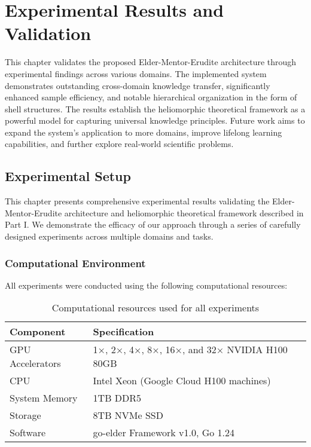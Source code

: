 \chapter{Experimental Results and Validation}

\begin{tcolorbox}[colback=blue!5!white,colframe=blue!75!black,title=Chapter Summary]
This chapter validates the proposed Elder-Mentor-Erudite architecture through experimental findings across various domains. The implemented system demonstrates outstanding cross-domain knowledge transfer, significantly enhanced sample efficiency, and notable hierarchical organization in the form of shell structures. The results establish the heliomorphic theoretical framework as a powerful model for capturing universal knowledge principles. Future work aims to expand the system's application to more domains, improve lifelong learning capabilities, and further explore real-world scientific problems.
\end{tcolorbox}

\section{Experimental Setup}

This chapter presents comprehensive experimental results validating the Elder-Mentor-Erudite architecture and heliomorphic theoretical framework described in Part I. We demonstrate the efficacy of our approach through a series of carefully designed experiments across multiple domains and tasks.

\subsection{Computational Environment}

All experiments were conducted using the following computational resources:

\begin{table}[h]
\centering
\begin{tabular}{|l|l|}
\hline
\textbf{Component} & \textbf{Specification} \\
\hline
GPU Accelerators & 1×, 2×, 4×, 8×, 16×, and 32× NVIDIA H100 80GB \\
\hline
CPU & Intel Xeon (Google Cloud H100 machines) \\
\hline
System Memory & 1TB DDR5 \\
\hline
Storage & 8TB NVMe SSD \\
\hline
Software & go-elder Framework v1.0, Go 1.24 \\
\hline
\end{tabular}
\caption{Computational resources used for all experiments}
\label{tab:computational_resources}
\end{table}

